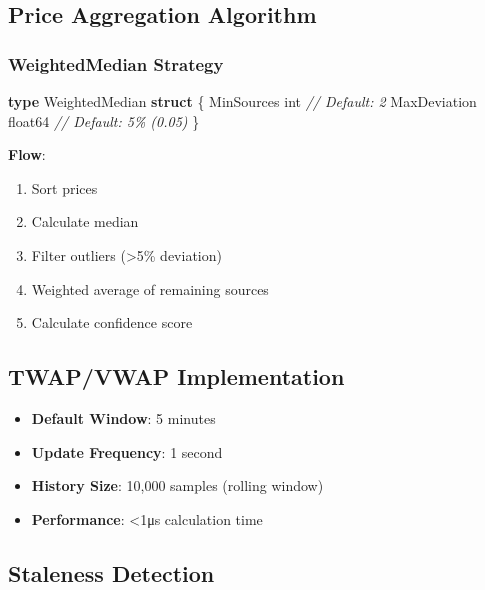 \documentclass[
]{article}
\newenvironment{Shaded}{}{}
\newcommand{\CommentTok}[1]{\textcolor[rgb]{0.38,0.63,0.69}{\textit{#1}}}
\newcommand{\DataTypeTok}[1]{\textcolor[rgb]{0.56,0.13,0.00}{#1}}
\newcommand{\KeywordTok}[1]{\textcolor[rgb]{0.00,0.44,0.13}{\textbf{#1}}}
\newcommand{\NormalTok}[1]{#1}
\newcommand{\OperatorTok}[1]{\textcolor[rgb]{0.40,0.40,0.40}{#1}}
\providecommand{\tightlist}{%
  \setlength{\itemsep}{0pt}\setlength{\parskip}{0pt}}
\begin{document}
\subsection{Price Aggregation
Algorithm}\label{price-aggregation-algorithm}

\subsubsection{WeightedMedian Strategy}\label{weightedmedian-strategy}

\begin{Shaded}
\begin{Highlighting}[]
\KeywordTok{type}\NormalTok{ WeightedMedian }\KeywordTok{struct} \OperatorTok{\{}
\NormalTok{    MinSources   }\DataTypeTok{int}     \CommentTok{// Default: 2}
\NormalTok{    MaxDeviation }\DataTypeTok{float64} \CommentTok{// Default: 5\% (0.05)}
\OperatorTok{\}}
\end{Highlighting}
\end{Shaded}

\textbf{Flow}:

\begin{enumerate}
\def\labelenumi{\arabic{enumi}.}
\tightlist
\item
  Sort prices
\item
  Calculate median
\item
  Filter outliers (\textgreater5\% deviation)
\item
  Weighted average of remaining sources
\item
  Calculate confidence score
\end{enumerate}

\subsection{TWAP/VWAP Implementation}\label{twapvwap-implementation}

\begin{itemize}
\tightlist
\item
  \textbf{Default Window}: 5 minutes
\item
  \textbf{Update Frequency}: 1 second
\item
  \textbf{History Size}: 10,000 samples (rolling window)
\item
  \textbf{Performance}: \textless1μs calculation time
\end{itemize}

\subsection{Staleness Detection}\label{staleness-detection}
\end{document}
